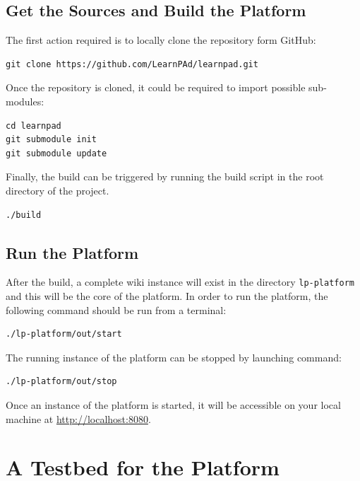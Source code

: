 \documentclass{learnpad}
\begin{document}
\section{Get the Sources and Build the Platform}
\label{sec:build}

The first action required is to locally clone the \learnpad
repository form GitHub:

\begin{lstlisting}[style=javaCode, breaklines]
git clone https://github.com/LearnPAd/learnpad.git
\end{lstlisting}

Once the repository is cloned, it could be required to import 
possible sub-modules:

\begin{lstlisting}[style=javaCode, breaklines]
cd learnpad
git submodule init
git submodule update
\end{lstlisting}

Finally, the build can be triggered by running the build script in the 
root directory of the project.

\begin{lstlisting}[style=javaCode, breaklines]
./build
\end{lstlisting}

\section{Run the Platform}
\label{sec:run}

After the build, a complete wiki instance will exist in the directory 
\texttt{lp-platform} and this will be the core of the platform. In order to run
the platform, the following command should be run from a terminal:

\begin{lstlisting}[style=javaCode, breaklines]
./lp-platform/out/start
\end{lstlisting}

The running instance of the platform can be stopped by launching command:

\begin{lstlisting}[style=javaCode, breaklines]
./lp-platform/out/stop
\end{lstlisting}

Once an instance of the \learnpad platform is started, it will be accessible on 
your local machine at \url{http://localhost:8080}.


\chapter{A Testbed for the \learnpad Platform}
\label{ch:testbed}
\end{document}
